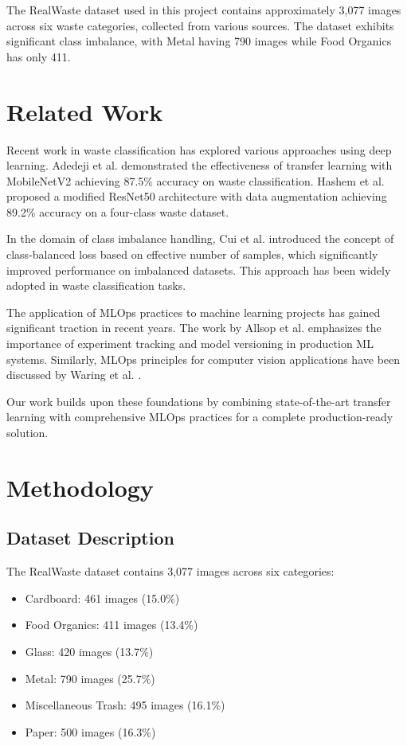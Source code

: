 \documentclass[conference]{IEEEtran}
\begin{document}
The RealWaste dataset used in this project contains approximately 3,077 images across six waste categories, collected from various sources. The dataset exhibits significant class imbalance, with Metal having 790 images while Food Organics has only 411.

\section{Related Work}

Recent work in waste classification has explored various approaches using deep learning. Adedeji et al. \cite{adedeji2021} demonstrated the effectiveness of transfer learning with MobileNetV2 achieving 87.5\% accuracy on waste classification. Hashem et al. \cite{hashem2022} proposed a modified ResNet50 architecture with data augmentation achieving 89.2\% accuracy on a four-class waste dataset.

In the domain of class imbalance handling, Cui et al. \cite{cui2021} introduced the concept of class-balanced loss based on effective number of samples, which significantly improved performance on imbalanced datasets. This approach has been widely adopted in waste classification tasks.

The application of MLOps practices to machine learning projects has gained significant traction in recent years. The work by Allsop et al. \cite{allsop2022} emphasizes the importance of experiment tracking and model versioning in production ML systems. Similarly, MLOps principles for computer vision applications have been discussed by Waring et al. \cite{waring2024}.

Our work builds upon these foundations by combining state-of-the-art transfer learning with comprehensive MLOps practices for a complete production-ready solution.

\section{Methodology}

\subsection{Dataset Description}
The RealWaste dataset contains 3,077 images across six categories:
\begin{itemize}
    \item Cardboard: 461 images (15.0\%)
    \item Food Organics: 411 images (13.4\%)
    \item Glass: 420 images (13.7\%)
    \item Metal: 790 images (25.7\%)
    \item Miscellaneous Trash: 495 images (16.1\%)
    \item Paper: 500 images (16.3\%)
\end{itemize}
\end{document}
